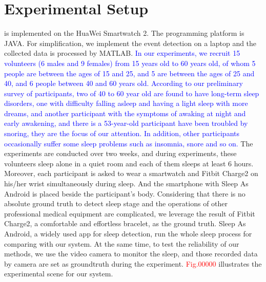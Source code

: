 \section{Experimental Setup}
{\systemname} is implemented on the HuaWei Smartwatch 2. The programming platform is JAVA. For simplification, we implement the event detection on a laptop and the collected data is processed by MATLAB. \textcolor{blue}{In our experiments, we recruit 15 volunteers (6 males and 9 females) from 15 years old to 60 years old,  of whom 5 people are between the ages of 15 and 25, and 5 are between the ages of 25 and 40, and 6 people between 40 and 60 years old. According to our preliminary survey of participants, two of 40 to 60 year old are found to have long-term sleep disorders,  one with difficulty falling asleep and having a light sleep with more dreams, and another participant with the symptoms of awaking at night and early awakening, and there is a 53-year-old participant have been troubled by snoring, they are the focus of our attention. In addition, other participants occasionally suffer some sleep problems such as insomnia, snore and so on.} The experiments are conducted over two weeks, and during experiments, these volunteers sleep alone in a quiet room and each of them sleeps at least 6 hours. Moreover, each participant is asked to wear a smartwatch and Fitbit Charge2 \cite{fitbit} on his/her wrist simultaneously during sleep. And the smartphone with Sleep As Android \cite{SleepAndroid} is placed beside the participant's body. Considering that there is no absolute ground truth to detect sleep stage and the operations of other professional medical equipment are complicated, we leverage the result of Fitbit Charge2, a comfortable and effortless bracelet, as the ground truth. Sleep As Android, a widely used app for sleep detection, run the whole sleep process for comparing with our system. At the same time, to test the reliability of our methods, we use the video camera to monitor the sleep, and those recorded data by camera are set as groundtruth during the experiment. \textcolor{red}{Fig.00000} illustrates the experimental scene for our system.

